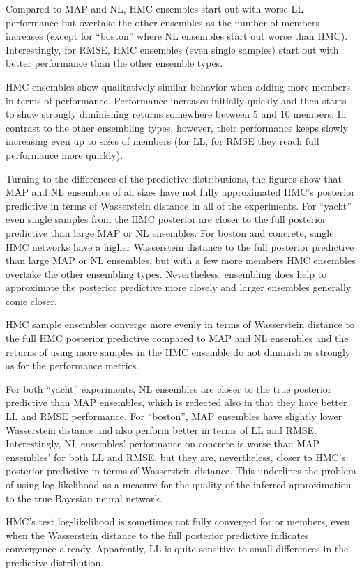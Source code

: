 \documentclass[../thesis.tex]{subfiles}
\begin{document}
Compared to MAP and NL, HMC ensembles start out with worse LL performance but overtake the other ensembles as the number of members increases (except for ``boston'' where NL ensembles start out worse than HMC). Interestingly, for RMSE, HMC ensembles (even single samples) start out with better performance than the other ensemble types.

HMC ensembles show qualitatively similar behavior when adding more members in terms of performance. Performance increases initially quickly and then starts to show strongly diminishing returns somewhere between 5 and 10 members. In contrast to the other ensembling types, however, their performance keeps slowly increasing even up to sizes of  members (for LL, for RMSE they reach full performance more quickly).

Turning to the differences of the predictive distributions, the figures show that MAP and NL ensembles of all sizes have not fully approximated HMC's posterior predictive in terms of Wasserstein distance in all of the experiments.
For ``yacht'' even single samples from the HMC posterior are closer to the full posterior predictive than large MAP or NL ensembles. For boston and concrete, single HMC networks have a higher Wasserstein distance to the full posterior predictive than large MAP or NL ensembles, but with a few more members HMC ensembles overtake the other ensembling types.
Nevertheless, ensembling does help to approximate the posterior predictive more closely and larger ensembles generally come closer.

HMC sample ensembles converge more evenly in terms of Wasserstein distance to the full HMC posterior predictive compared to MAP and NL ensembles and the returns of using more samples in the HMC ensemble do not diminish as strongly as for the performance metrics.

For both ``yacht'' experiments, NL ensembles are closer to the true posterior predictive than MAP ensembles, which is reflected also in that they have better LL and RMSE performance. For ``boston'', MAP ensembles have slightly lower Wasserstein distance and also perform better in terms of LL and RMSE. Interestingly, NL ensembles' performance on concrete is worse than MAP ensembles' for both LL and RMSE, but they are, nevertheless, closer to HMC's posterior predictive in terms of Wasserstein distance. This underlines the problem of using log-likelihood as a measure for the quality of the inferred approximation to the true Bayesian neural network.

HMC's test log-likelihood is sometimes not fully converged for  or  members, even when the Wasserstein distance to the full posterior predictive indicates convergence already. Apparently, LL is quite sensitive to small differences in the predictive distribution.
\end{document}

